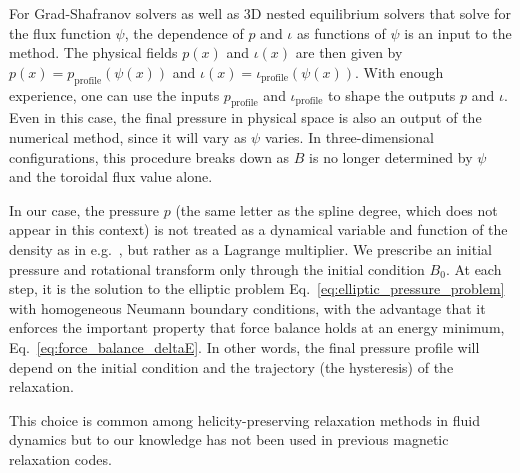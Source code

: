 \documentclass[%
 reprint,
 superscriptaddress,
 amsmath,amssymb,
 aps, nofootinbib, floatfix]{revtex4-2}
\begin{document}

For Grad-Shafranov solvers as well as 3D nested equilibrium solvers that solve for the flux function $\psi$, the dependence of $p$ and $\iota$ as functions of $\psi$ is an input to the method. The physical fields $p(x)$ and $\iota(x)$ are then given by $p(x) = p_{\mathrm{profile}}(\psi(x))$ and $\iota(x) = \iota_{\mathrm{profile}}(\psi(x))$. With enough experience, one can use the inputs $p_{\mathrm{profile}}$ and $\iota_{\mathrm{profile}}$ to shape the outputs $p$ and $\iota$. Even in this case, the final pressure in physical space is also an output of the numerical method, since it will vary as $\psi$ varies. In three-dimensional configurations, this procedure breaks down as $B$ is no longer determined by $\psi$ and the toroidal flux value alone.

In our case, the pressure $p$ (the same letter as the spline degree, which does not appear in this context) is not treated as a dynamical variable and function of the density as in e.g.~\cite{chodura_3d_1981, hender_calculation_1985, hirshman_siesta_2011}, but rather as a Lagrange multiplier. We prescribe an initial pressure and rotational transform only through the initial condition $B_0$. At each step, it is the solution to the elliptic problem Eq.~\eqref{eq:elliptic_pressure_problem} with homogeneous Neumann boundary conditions, with the advantage that it enforces the important property that force balance holds at an energy minimum, Eq.~\eqref{eq:force_balance_deltaE}. In other words, the final pressure profile will depend on the initial condition and the trajectory (the hysteresis) of the relaxation.     
\begin{remark}
    This choice is common among helicity-preserving relaxation methods in fluid dynamics but to our knowledge has not been used in previous magnetic relaxation codes. 
\end{remark}
\end{document}
